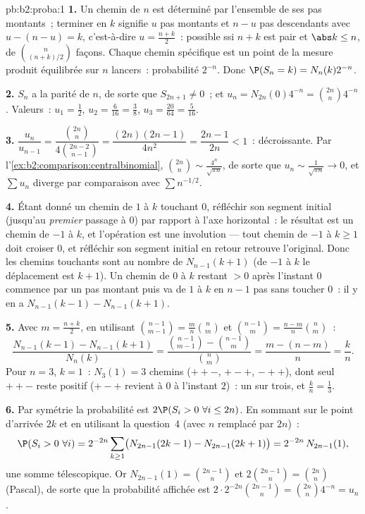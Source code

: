 \begin{solution}{pb:b2:proba:1}
\textbf{1.} Un chemin de  $n$ est déterminé par l'ensemble de
ses pas montants~; terminer en $k$ signifie $u$ pas montants et $n - u$
pas descendants avec $u - (n - u) = k$, c'est-à-dire $u = \frac{n+k}2$~:
possible ssi $n + k$ est pair et $\abs k \leq n$, de
$\binom{n}{(n+k)/2}$ façons. Chaque chemin spécifique est un point de
la mesure produit équilibrée sur $n$ lancers~: probabilité $2^{-n}$.
Donc $\P(S_n = k) = N_n(k)2^{-n}$.

\textbf{2.} $S_n$ a la parité de $n$, de sorte que $S_{2n+1} \neq
0$~; et $u_n = N_{2n}(0)4^{-n} = \binom{2n}n4^{-n}$. Valeurs~:
$u_1 = \frac12$, $u_2 = \frac6{16} = \frac38$, $u_3 =
\frac{20}{64} = \frac5{16}$.

\textbf{3.} $\dfrac{u_n}{u_{n-1}} =
\dfrac{\binom{2n}n}{4\binom{2n-2}{n-1}} =
\dfrac{(2n)(2n-1)}{4n^2} = \dfrac{2n-1}{2n} < 1$~: décroissante.
Par l'\cref{ex:b2:comparison:centralbinomial}, $\binom{2n}n \sim
\frac{4^n}{\sqrt{\pi n}}$, de sorte que $u_n \sim \frac1{\sqrt{\pi n}}
\to 0$, et $\sum u_n$ diverge par comparaison avec $\sum
n^{-1/2}$.

\textbf{4.} Étant donné un chemin de $1$ à $k$ touchant $0$,
réfléchir son segment initial (jusqu'au \emph{premier} passage à
$0$) par rapport à l'axe horizontal~: le résultat est un chemin de
$-1$ à $k$, et l'opération est une involution --- tout
chemin de $-1$ à $k \geq 1$ doit croiser $0$, et réfléchir
son segment initial en retour retrouve l'original. Donc les
chemins touchants sont au nombre de $N_{n-1}(k + 1)$ (de $-1$ à $k$ le
déplacement est $k + 1$). Un chemin de $0$ à $k$ restant $>
0$ après l'instant $0$ commence par un pas montant puis va de
$1$ à $k$ en $n - 1$ pas sans toucher $0$~: il y en a
$N_{n-1}(k-1) - N_{n-1}(k+1)$.

\textbf{5.} Avec $m = \frac{n+k}2$, en utilisant
$\binom{n-1}{m-1} = \frac mn\binom nm$ et $\binom{n-1}{m} =
\frac{n-m}n\binom nm$~:
\[
\frac{N_{n-1}(k-1) - N_{n-1}(k+1)}{N_n(k)}
= \frac{\binom{n-1}{m-1} - \binom{n-1}{m}}{\binom nm}
= \frac{m - (n - m)}{n} = \frac kn .
\]
Pour $n = 3$, $k = 1$~: $N_3(1) = 3$ chemins ($++-$, $+-+$,
$-++$), dont seul $++-$ reste positif ($+-+$ revient à
$0$ à l'instant $2$)~: un sur trois, et $\frac kn = \frac13$.

\textbf{6.} Par symétrie la probabilité est $2\P(S_i > 0\ \forall
i \leq 2n)$. En sommant sur le point d'arrivée $2k$ et en utilisant
la question~4 (avec $n$ remplacé par $2n$)~:
\[
\P(S_i > 0\ \forall i) = 2^{-2n}\sum_{k\geq1}
\bigl(N_{2n-1}(2k-1) - N_{2n-1}(2k+1)\bigr)
= 2^{-2n}\,N_{2n-1}(1),
\]
une somme télescopique. Or $N_{2n-1}(1) = \binom{2n-1}{n}$ et
$2\binom{2n-1}n = \binom{2n}n$ (Pascal), de sorte que la
probabilité affichée est $2\cdot2^{-2n}\binom{2n-1}n =
\binom{2n}n4^{-n} = u_n$.


\end{solution}
